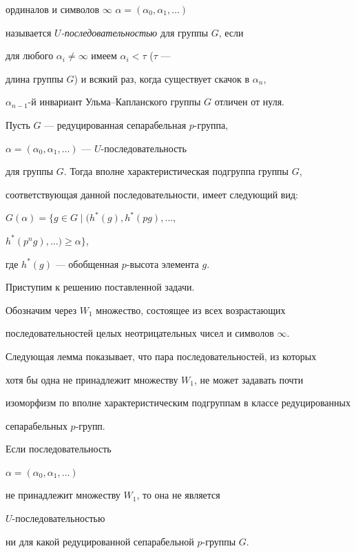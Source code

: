 ординалов и символов $\infty$\; $\alpha=(\alpha_0,\alpha_1,\dotsc)$


называется {\it $U$-последовательностью} для группы $G$, если


для любого $\alpha_i \neq \infty$ имеем $\alpha_i<\tau$ ($\tau$ ---


длина группы $G$) и всякий раз, когда существует скачок в $\alpha_n$,


$\alpha_{n-1}$-й инвариант Ульма--Капланского группы $G$ отличен от нуля.





Пусть $G$ --- редуцированная сепарабельная $p$-группа,


$\alpha=(\alpha_0,\alpha_1,\dotsc)$ --- $U$-последователь\-ность


для группы $G$. Тогда вполне характеристическая подгруппа группы $G$,


соответствующая данной последовательности, имеет следующий вид:


$G(\alpha)=\{g\in G\mid(h^*(g),h^*(pg),\dotsc$,\linebreak




$h^*(p^n g),\dotsc)\ge\alpha\}$,


где $h^*(g)$ --- обобщенная $p$-высота элемента $g$.





Приступим к решению поставленной задачи.


Обозначим через $W_1$ множество, состоящее из всех возрастающих


последовательностей целых неотрицательных чисел и символов $\infty$.





Следующая лемма показывает, что пара последовательностей, из которых


хотя бы одна не принадлежит множеству $W_1$, не может задавать почти


изоморфизм по вполне характеристическим подгруппам в классе редуцированных


сепарабельных $p$-групп.





\begin{lems}


Если последовательность


$\alpha=(\alpha_0, \alpha_1, \dotsc)$


не принадлежит множеству $W_1$, то она не является


$U$-последовательностью


ни для какой редуцированной сепарабельной $p$-группы $G$.


\end{lems}





